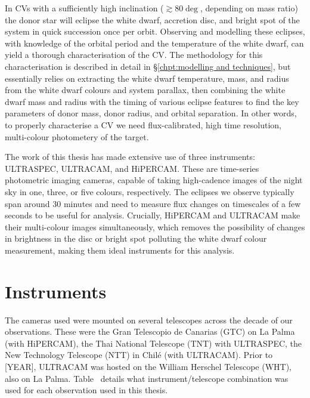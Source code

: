 
\label{chpt:observations and observational techniques} %

In CVs with a sufficiently high inclination ($\gtrsim 80 \deg$, depending on mass ratio) the donor star will eclipse the white dwarf, accretion disc, and bright spot of the system in quick succession once per orbit. Observing and modelling these eclipses, with knowledge of the orbital period and the temperature of the white dwarf, can yield a thorough characterisation of the CV. The methodology for this characterisation is described in detail in \S\ref{chpt:modelling and techniques}, but essentially relies on extracting the white dwarf temperature, mass, and radius from the white dwarf colours and system parallax, then combining the white dwarf mass and radius with the timing of various eclipse features to find the key parameters of donor mass, donor radius, and orbital separation. In other words, to properly characterise a CV we need flux-calibrated, high time resolution, multi-colour photometery of the target.

The work of this thesis has made extensive use of three instruments: ULTRASPEC, ULTRACAM, and HiPERCAM.
These are time-series photometric imaging cameras, capable of taking high-cadence images of the night sky in one, three, or five colours, respectively.
The eclipses we observe typically span around 30 minutes and need to measure flux changes on timescales of a few seconds to be useful for analysis.
Crucially, HiPERCAM and ULTRACAM make their multi-colour images simultaneously, which removes the possibility of changes in brightness in the disc or bright spot polluting the white dwarf colour measurement, making them ideal instruments for this analysis.


\section{Instruments}
\label{sect:observations:cameras}

The cameras used were mounted on several telescopes across the decade of our observations. These were the Gran Telescopio de Canarias (GTC) on La Palma (with HiPERCAM), the Thai National Telescope (TNT) with ULTRASPEC, the New Technology Telescope (NTT) in Chil\'e (with ULTRACAM). Prior to [YEAR], ULTRACAM was hosted on the William Herschel Telescope (WHT), also on La Palma. Table~ details what instrument/telescope combination was used for each observation used in this thesis.


